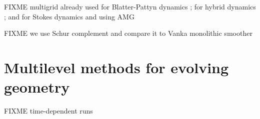 \documentclass[letterpaper,final,12pt,reqno]{amsart}
\theoremstyle{claim}
\numberwithin{equation}{section}
\numberwithin{figure}{section}
\numberwithin{table}{section}
\numberwithin{theorem}{section}
\begin{document}
FIXME multigrid already used for Blatter-Pattyn dynamics \cite{BrownSmithAhmadia2013}; for hybrid dynamics \cite{Jouvetetal2013,JouvetGraeser2013}; and for Stokes dynamics \cite{IsaacStadlerGhattas2015} and \cite{Tuminaroetal2016} using AMG

FIXME we use Schur complement \cite{Bueler2021,Elmanetal2014} and compare it to Vanka monolithic smoother \cite{Farrelletal2019}

\section{Multilevel methods for evolving geometry} \label{sec:stokesevolution}

FIXME time-dependent runs

\small

\bigskip


\end{document}

